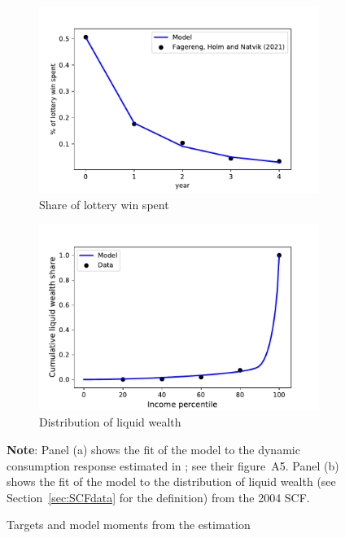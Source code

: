 \documentclass[../HAFiscal]{subfiles}
\begin{document}
\begin{figure}[htb]
\centering
\begin{subfigure}[b]{.48\linewidth}
	\centering
	\includegraphics[width=\linewidth]{../Code/HA-Models/Target_AggMPCX_LiquWealth/Figures/AggMPC_LotteryWin}
	\caption{Share of lottery win spent}
	\label{fig:aggmpclotterywin}
\end{subfigure}
\begin{subfigure}[b]{.48\linewidth}
	\centering
	\includegraphics[width=\linewidth]{../Code/HA-Models/Target_AggMPCX_LiquWealth/Figures/LiquWealth_Distribution}
	\caption{Distribution of liquid wealth}
	\label{fig:liquwealthdistribution}
\end{subfigure}%
\caption{Targets and model moments from the estimation}
\label{fig:splurge_estimation}
\parbox{16cm}{\small \vspace{.15cm} \textbf{Note}: Panel (a) shows the fit of the model to the dynamic consumption response estimated in \citet{fagereng_mpc_2021}; see their figure~A5. Panel (b) shows the fit of the model to the distribution of liquid wealth (see Section~\ref{sec:SCFdata} for the definition) from the 2004 SCF.\normalsize}
\end{figure}
\end{document}
